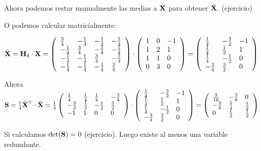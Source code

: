 \begin{frame}
Ahora podemos restar manualmente las medias a $\mathbf{X}$ para obtener $\tilde{\mathbf{X}}$. (ejercicio)

O podemos calcular matricialmente:

$\tilde{\mathbf{X}}= \mathbf{H}_4\cdot \mathbf{X}= 
\left(
\begin{array}{llll}
 \frac{3}{4} & -\frac{1}{4} & -\frac{1}{4} &
   -\frac{1}{4} \\
 -\frac{1}{4} & \frac{3}{4} & -\frac{1}{4} &
   -\frac{1}{4} \\
 -\frac{1}{4} & -\frac{1}{4} & \frac{3}{4} &
   -\frac{1}{4} \\
 -\frac{1}{4} & -\frac{1}{4} & -\frac{1}{4} &
   \frac{3}{4}
\end{array}
\right)
\cdot 
\left(
\begin{array}{lll}
 1 & 0 & -1 \\
 1 & 2 & 1 \\
 1 & 1 & 0 \\
 0 & 3 & 0
\end{array}
\right)=\left(
\begin{array}{lll}
 \frac{1}{4} & -\frac{3}{2} & -1 \\
 \frac{1}{4} & \frac{1}{2} & 1 \\
 \frac{1}{4} & -\frac{1}{2} & 0 \\
 -\frac{3}{4} & \frac{3}{2} & 0
\end{array}
\right)$
\end{frame}

\begin{frame}

Ahora $\mathbf{S}=\frac{1}{4}\tilde{\mathbf{X}}^\top\cdot \tilde{\mathbf{X}}=
\frac{1}{4}     
\left(
\begin{array}{llll}
 \frac{1}{4} & \frac{1}{4} & \frac{1}{4} & -\frac{3}{4} \\
 -\frac{3}{2} & \frac{1}{2} & -\frac{1}{2} & \frac{3}{2} \\
 -1 & 1 & 0 & 0
\end{array}
\right)
\cdot
\left(
\begin{array}{lll}
 \frac{1}{4} & -\frac{3}{2} & -1 \\
 \frac{1}{4} & \frac{1}{2} & 1 \\
 \frac{1}{4} & -\frac{1}{2} & 0 \\
 -\frac{3}{4} & \frac{3}{2} & 0
\end{array}
\right)=\left(
\begin{array}{lll}
 \frac{3}{16} & -\frac{3}{8} & 0 \\
 -\frac{3}{8} & \frac{5}{4} & \frac{1}{2} \\
 0 & \frac{1}{2} & \frac{1}{2}
\end{array}
\right)
$

Si calculamos $\det(\mathbf{S})=0$ (ejercicio). Luego existe al menos una variable redundante.
\end{frame}

